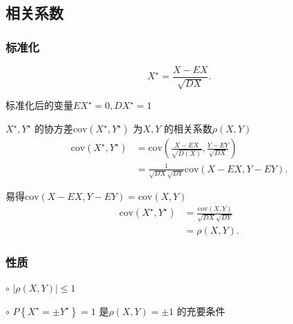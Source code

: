 \subsection{相关系数}%
\label{sub:相关系数}
\subsubsection{标准化}%
\label{subsub:标准化}
\[
    X^\star=\frac{X-EX}{\sqrt{DX} } 
.\] 

标准化后的变量$EX^\star=0,DX^\star=1$

\begin{defi}
    $X^\star,Y^\star$ 的协方差$\text{cov}\left( X^\star,Y^\star \right) $ 为$X,Y$ 的相关系数$\rho\left( X,Y \right) $
    \begin{align*}
        \text{cov}\left( X^\star,Y^\star \right) &=\text{cov}\left( \frac{X-EX }{\sqrt{D\left( X \right) } } ,\frac{Y-EY}{\sqrt{DX} }  \right) \\
        &= \frac{1}{\sqrt{DX} \sqrt{DY} } \text{cov}\left( X-EX,Y-EY \right)
    .\end{align*}

    易得$\text{cov}\left( X-EX,Y-EY \right) =\text{cov}\left( X,Y \right) $
    \begin{align*}
        \text{cov}\left( X^\star,Y^\star \right) &= \frac{\text{cov}\left( X,Y \right) }{\sqrt{DX}\sqrt{DY} }  \\
        &= \rho\left( X,Y \right) 
    .\end{align*}
\end{defi}

\subsubsection{性质}%
\label{subsub:性质}
$\circ$ $\left| \rho\left( X,Y \right)  \right| \le 1$ 

$\circ$ ${P\left\{ X^\star=\pm Y^\star \right\} =1}$ 是$\rho\left( X,Y \right) =\pm1$ 的充要条件


